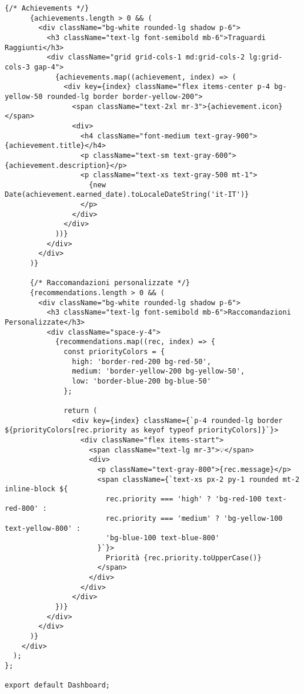 \documentclass[a4paper, 14pt, oneside]{extbook}
\begin{document}
\begin{lstlisting}[style=javascriptstyle, caption=Dashboard Intelligente con Analytics Avanzate, label=lst:dashboard-component]
      {/* Achievements */}
      {achievements.length > 0 && (
        <div className="bg-white rounded-lg shadow p-6">
          <h3 className="text-lg font-semibold mb-6">Traguardi Raggiunti</h3>
          <div className="grid grid-cols-1 md:grid-cols-2 lg:grid-cols-3 gap-4">
            {achievements.map((achievement, index) => (
              <div key={index} className="flex items-center p-4 bg-yellow-50 rounded-lg border border-yellow-200">
                <span className="text-2xl mr-3">{achievement.icon}</span>
                <div>
                  <h4 className="font-medium text-gray-900">{achievement.title}</h4>
                  <p className="text-sm text-gray-600">{achievement.description}</p>
                  <p className="text-xs text-gray-500 mt-1">
                    {new Date(achievement.earned_date).toLocaleDateString('it-IT')}
                  </p>
                </div>
              </div>
            ))}
          </div>
        </div>
      )}

      {/* Raccomandazioni personalizzate */}
      {recommendations.length > 0 && (
        <div className="bg-white rounded-lg shadow p-6">
          <h3 className="text-lg font-semibold mb-6">Raccomandazioni Personalizzate</h3>
          <div className="space-y-4">
            {recommendations.map((rec, index) => {
              const priorityColors = {
                high: 'border-red-200 bg-red-50',
                medium: 'border-yellow-200 bg-yellow-50',
                low: 'border-blue-200 bg-blue-50'
              };
              
              return (
                <div key={index} className={`p-4 rounded-lg border ${priorityColors[rec.priority as keyof typeof priorityColors]}`}>
                  <div className="flex items-start">
                    <span className="text-lg mr-3">💡</span>
                    <div>
                      <p className="text-gray-800">{rec.message}</p>
                      <span className={`text-xs px-2 py-1 rounded mt-2 inline-block ${
                        rec.priority === 'high' ? 'bg-red-100 text-red-800' :
                        rec.priority === 'medium' ? 'bg-yellow-100 text-yellow-800' :
                        'bg-blue-100 text-blue-800'
                      }`}>
                        Priorità {rec.priority.toUpperCase()}
                      </span>
                    </div>
                  </div>
                </div>
            })}
          </div>
        </div>
      )}
    </div>
  );
};

export default Dashboard;
\end{lstlisting}
\end{document}
